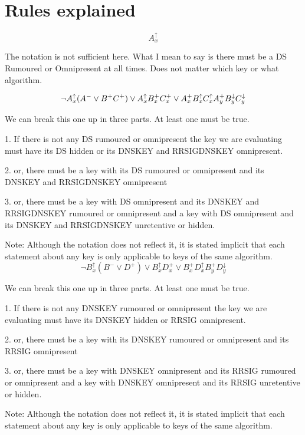 \documentclass[twoside, a4paper]{article}
\begin{document}
\section{Rules explained}

\begin{equation}
A_{x}^{\uparrow} 
\end{equation}

The notation is not sufficient here. What I mean to say is there must
be a DS Rumoured or Omnipresent at all times. Does not matter which key
or what algorithm.

\begin{equation}
\neg A_{x}^{\uparrow} (A^{-} \vee B^{+} C^{+}) \vee A_{x}^{\uparrow}
	B_{x}^{+} C_{x}^{+} \vee A_{x}^{+} B_{x}^{\uparrow} C_{x}^{\uparrow}
	A_{y}^{+} B_{y}^{\downarrow} C_{y}^{\downarrow}\\
\end{equation}

We can break this one up in three parts. At least one must be true.

1. If there is not any DS rumoured or omnipresent the key we are evaluating
must have its DS hidden or its DNSKEY and RRSIGDNSKEY omnipresent.

2. or, there must be a key with its DS rumoured or omnipresent and 
its DNSKEY and RRSIGDNSKEY omnipresent

3. or, there must be a key with DS omnipresent and its DNSKEY and RRSIGDNSKEY rumoured or omnipresent
and a key with DS omnipresent and its DNSKEY and RRSIGDNSKEY unretentive or hidden.

Note: Although the notation does not reflect it, it is stated implicit
that each statement about any key is only applicable to keys of the same algorithm.
\begin{equation}
\neg B_{x}^{\uparrow} (B^{-} \vee D^{+}) \vee 
	B_{x}^{\uparrow} D_{x}^{+} \vee 
	B_{x}^{+} D_{x}^{\uparrow} B_{y}^{+} D_{y}^{\downarrow}
\end{equation}

We can break this one up in three parts. At least one must be true.

1. If there is not any DNSKEY rumoured or omnipresent the key we are evaluating
must have its DNSKEY hidden or RRSIG omnipresent.

2. or, there must be a key with its DNSKEY rumoured or omnipresent and 
its RRSIG omnipresent

3. or, there must be a key with DNSKEY omnipresent and its RRSIG rumoured or omnipresent
and a key with DNSKEY omnipresent and its RRSIG unretentive or hidden.

Note: Although the notation does not reflect it, it is stated implicit
that each statement about any key is only applicable to keys of the same algorithm.
\end{document}
